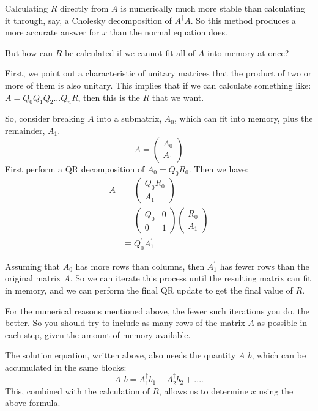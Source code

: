 \documentclass[twoside,letterpaper,11pt]{article}
\begin{document}
Calculating $R$ directly from $A$ is numerically much more stable than 
calculating it through, say, a Cholesky decomposition of $A^\dagger A$.
So this method produces a more accurate answer for $x$ than the normal equation does.

But how can $R$ be calculated if we cannot fit all of $A$ into memory at once?

First, we point out a characteristic of unitary matrices that the product 
of two or more of them is also unitary.  
This implies that if we can calculate
something like: $A = Q_0 Q_1 Q_2 ... Q_n R$, then this is the $R$ that we want.

So, consider breaking $A$ into a submatrix, $A_0$, which can fit into memory, 
plus the remainder, $A_1$.
\begin{equation*}
A = \left(\begin{array}{c}A_0 \\A_1\end{array}\right)
\end{equation*}
First perform a QR decomposition of $A_0 = Q_0 R_0$.  Then we have:
\begin{align*}
A &= \left(\begin{array}{c}Q_0 R_0 \\ A_1 \end{array}\right) \\
&= \left(\begin{array}{cc}Q_0 & 0 \\ 0 & 1\end{array}\right) 
      \left(\begin{array}{c}R_0 \\ A_1 \end{array}\right) \\
&\equiv Q_0^\prime A_1^\prime
\end{align*}

Assuming that $A_0$ has more rows than columns, 
then $A_1^\prime$ has fewer rows than
the original matrix $A$.  So we can iterate this process until the 
resulting matrix can fit in memory, and we can perform the final QR update
to get the final value of $R$.

For the numerical reasons mentioned above, 
the fewer such iterations you do, the better.  So you should try to include as many
rows of the matrix $A$ as possible in each step, given the amount of memory
available.

The solution equation, written above, also needs the quantity $A^\dagger b$, which
can be accumulated in the same blocks:
\begin{equation}
A^\dagger b = A_1^\dagger b_1 + A_2^\dagger b_2 + ....
\end{equation}
This, combined with the calculation of $R$, allows us to determine $x$ using the above formula.
\end{document}
